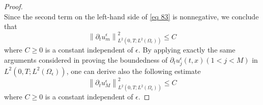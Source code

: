 \begin{proof}
\begin{equation}
\label{eq 83}\end{equation}
Since the second term on the left-hand side of \eqref{eq 83} is nonnegative, we conclude that 
\begin{equation}
  \left\|\partial_{t} u_{m}^{\epsilon}\right\|_{L^{2}\left(0, T ; L^{2}\left(\Omega_{\epsilon}\right)\right)}^{2} \leq C
\label{eq 84}\end{equation}
where $C \geq 0$ is a constant independent of $\epsilon$.
By applying exactly the same arguments considered in proving the boundedness of $\partial_{t} u_{j}^{\epsilon}(t, x)(1<j<M)$ in $L^{2}\left(0, T ; L^{2}\left(\Omega_{\epsilon}\right)\right)$, one can derive also the following estimate
\begin{equation}
  \left\|\partial_{t} u_{M}^{\epsilon}\right\|_{L^{2}\left(0, T ; L^{2}\left(\Omega_{\epsilon}\right)\right)}^{2} \leq C
\label{eq 85}\end{equation}
where $C \geq 0$ is a constant independent of $\epsilon$.
\end{proof}
